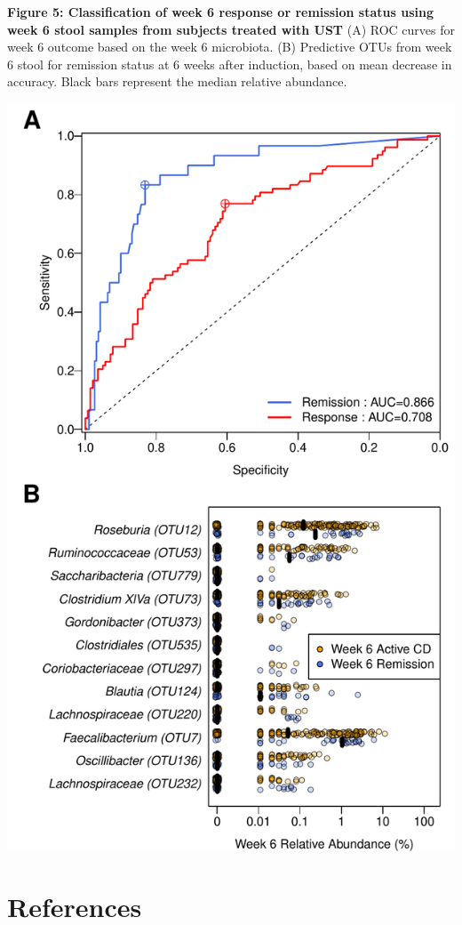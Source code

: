 \documentclass[12pt,]{article}
\begin{document}
\newpage

\textbf{Figure 5: Classification of week 6 response or remission status
using week 6 stool samples from subjects treated with UST} (A) ROC
curves for week 6 outcome based on the week 6 microbiota. (B) Predictive
OTUs from week 6 stool for remission status at 6 weeks after induction,
based on mean decrease in accuracy. Black bars represent the median
relative abundance.

\includegraphics{figures/Figure5_wk6Xwk6.pdf}

\newpage

\section*{References}\label{references}
\end{document}
